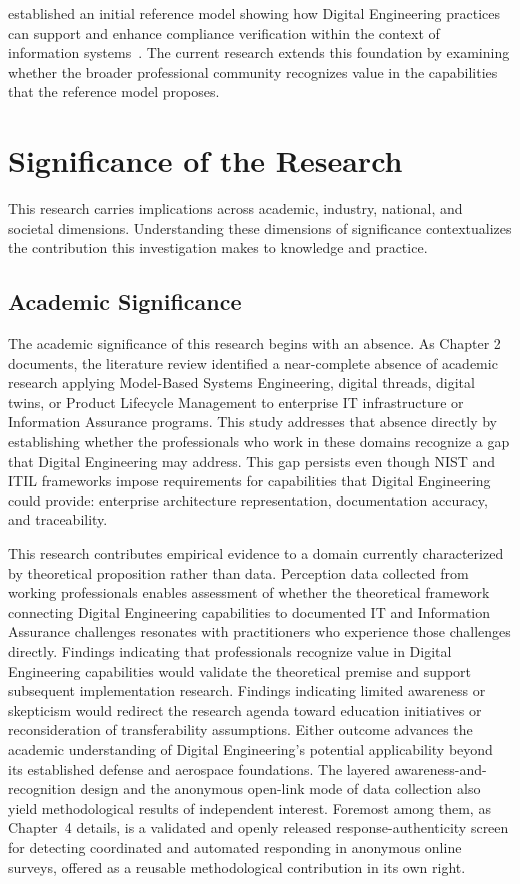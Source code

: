 \citeauthor{Bonar_Hastings_2024} established an initial reference model showing how Digital Engineering practices can support and enhance compliance verification within the context of information systems~\parencite{Bonar_Hastings_2024}. The current research extends this foundation by examining whether the broader professional community recognizes value in the capabilities that the reference model proposes.

\section{Significance of the Research}

This research carries implications across academic, industry, national, and societal dimensions. Understanding these dimensions of significance contextualizes the contribution this investigation makes to knowledge and practice.

\subsection{Academic Significance}

The academic significance of this research begins with an absence. As Chapter 2 documents, the literature review identified a near-complete absence of academic research applying Model-Based Systems Engineering, digital threads, digital twins, or Product Lifecycle Management to enterprise IT infrastructure or Information Assurance programs. This study addresses that absence directly by establishing whether the professionals who work in these domains recognize a gap that Digital Engineering may address. This gap persists even though NIST and ITIL frameworks impose requirements for capabilities that Digital Engineering could provide: enterprise architecture representation, documentation accuracy, and traceability.

This research contributes empirical evidence to a domain currently characterized by theoretical proposition rather than data. Perception data collected from working professionals enables assessment of whether the theoretical framework connecting Digital Engineering capabilities to documented IT and Information Assurance challenges resonates with practitioners who experience those challenges directly. Findings indicating that professionals recognize value in Digital Engineering capabilities would validate the theoretical premise and support subsequent implementation research. Findings indicating limited awareness or skepticism would redirect the research agenda toward education initiatives or reconsideration of transferability assumptions. Either outcome advances the academic understanding of Digital Engineering's potential applicability beyond its established defense and aerospace foundations. The layered awareness-and-recognition design and the anonymous open-link mode of data collection also yield methodological results of independent interest. Foremost among them, as Chapter~4 details, is a validated and openly released response-authenticity screen for detecting coordinated and automated responding in anonymous online surveys, offered as a reusable methodological contribution in its own right.

